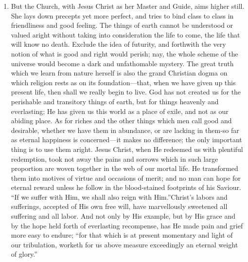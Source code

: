 \documentclass{book}
\begin{document}
\begin{enumerate}
	\item But the Church, with Jesus Christ as her Master and Guide, aims higher still. She lays down precepts yet more perfect, and tries to bind class to class in friendliness and good feeling. The things of earth cannot be understood or valued aright without taking into consideration the life to come, the life that will know no death. Exclude the idea of futurity, and forthwith the very notion of what is good and right would perish; nay, the whole scheme of the universe would become a dark and unfathomable mystery. The great truth which we learn from nature herself is also the grand Christian dogma on which religion rests as on its foundation—that, when we have given up this present life, then shall we really begin to live. God has not created us for the perishable and transitory things of earth, but for things heavenly and everlasting; He has given us this world as a place of exile, and not as our abiding place. As for riches and the other things which men call good and desirable, whether we have them in abundance, or are lacking in them-so far as eternal happiness is concerned—it makes no difference; the only important thing is to use them aright. Jesus Christ, when He redeemed us with plentiful redemption, took not away the pains and sorrows which in such large proportion are woven together in the web of our mortal life. He transformed them into motives of virtue and occasions of merit; and no man can hope for eternal reward unless he follow in the blood-stained footprints of his Saviour. “If we suffer with Him, we shall also reign with Him.”\footnotemark[6] Christ’s labors and sufferings, accepted of His own free will, have marvellously sweetened all suffering and all labor. And not only by His example, but by His grace and by the hope held forth of everlasting recompense, has He made pain and grief more easy to endure; “for that which is at present momentary and light of our tribulation, worketh for us above measure exceedingly an eternal weight of glory.”\footnotemark[7]



\end{enumerate}
\end{document}
